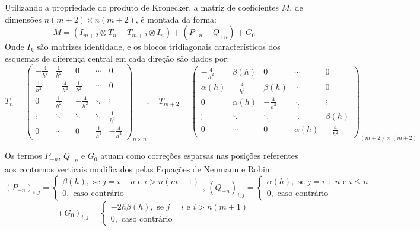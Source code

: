\documentclass[12pt, a4paper]{article}
\begin{document}
    Utilizando a propriedade do produto de Kronecker, a matriz de coeficientes $M$, de dimensões $n(m+2) \times n(m+2)$, é montada da forma:
    \[M = (I_{m+2} \otimes T_{n} + T_{m+2} \otimes I_{n}) + (P_{-n}+Q_{+n}) + G_0\]
    Onde $I_k$ são matrizes identidade, e os blocos tridiagonais característicos dos esquemas de diferença central em cada direção são dados por:
    \[T_n = \begin{pmatrix}
        -\frac{4}{h^2} & \frac{1}{h^2} & 0 & \cdots & 0 \\
        \frac{1}{h^2} & -\frac{4}{h^2} & \frac{1}{h^2} & \cdots & 0 \\
        0 & \frac{1}{h^2} & -\frac{4}{h^2} & \ddots & \vdots \\
        \vdots & \ddots & \ddots & \ddots & \frac{1}{h^2} \\
        0 & \cdots & 0 & \frac{1}{h^2} & -\frac{4}{h^2}
    \end{pmatrix}_{n \times n}\!\!\!\!\!\!\!\!\!\!,\!\!\!\!\! \quad T_{m+2} = \begin{pmatrix}
        -\frac{4}{h^2} & \beta(h) & 0 & \cdots & 0 \\
        \alpha(h) & -\frac{4}{h^2} & \beta(h) & \cdots & 0 \\
        0 & \alpha(h) & -\frac{4}{h^2} & \ddots & \vdots \\
        \vdots & \ddots & \ddots & \ddots & \beta(h) \\
        0 & \cdots & 0 & \alpha(h) & -\frac{4}{h^2}
    \end{pmatrix}_{(m+2) \times (m+2)}\]

    Os termos $P_{-n}$, $Q_{+n}$ e $G_0$ atuam como correções esparsas nas posições referentes aos contornos verticais modificados pelas Equações de Neumann e Robin:
    \[(P_{-n})_{i,j} = \begin{cases}
        \displaystyle \beta(h), \text{ se $j = i-n$ e $i > n(m+1)$}\\[.2cm]
        0, \text{ caso contrário}
    \end{cases}\!\!\!\!\!\!,\, (Q_{+n})_{i,j} = \begin{cases}
        \displaystyle \alpha(h), \text{ se $j = i+n$ e $i \leq n$}\\[.2cm]
        0, \text{ caso contrário}
    \end{cases}\]
    \[(G_0)_{i,j} = \begin{cases}
        \displaystyle -2h\beta(h), \text{ se $j = i$ e $i > n(m+1)$}\\[.2cm]
        0, \text{ caso contrário}
    \end{cases}\]
    
\end{document}
